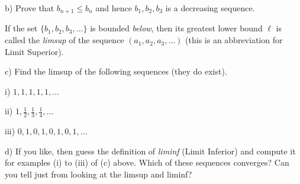 \documentclass[10pt]{article}
\begin{document}
b) Prove that $b_{n+1}\leq b_n$ and hence $b_1,b_2,b_3$ is a decreasing sequence.

If the set $\{b_1,b_2,b_3,\ldots\}$ is bounded \emph{below}, then its greatest lower bound $\ell$ is called the \emph{limsup} of the sequence $(a_1,a_2,a_3,\ldots)$ (this is an abbreviation for Limit Superior).

c) Find the limsup of the following sequences (they do exist).

i) $1,1,1,1,1,\ldots$

ii) $1,\frac{1}{2},\frac{1}{3},\frac{1}{4},\ldots$

iii) $0,1,0,1,0,1,0,1,\ldots$

d) If you like, then guess the definition of \emph{liminf} (Limit Inferior) and compute it for examples (i) to (iii) of (c) above. Which of these sequences converges? Can you tell just from looking at the limsup and liminf? 
\end{document}
